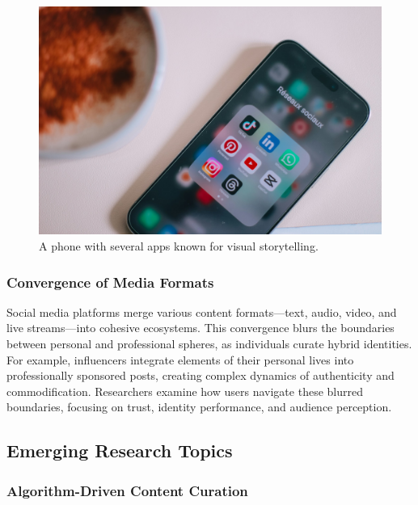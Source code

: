 \documentclass[
]{book}
\begin{document}
\begin{figure}
\centering
\includegraphics[width=1\linewidth,height=\textheight,keepaspectratio]{images/visual-story.jpg}
\caption{A phone with several apps known for visual storytelling.}
\end{figure}

\subsubsection*{Convergence of Media Formats}\label{convergence-of-media-formats}

Social media platforms merge various content formats---text, audio, video, and live streams---into cohesive ecosystems. This convergence blurs the boundaries between personal and professional spheres, as individuals curate hybrid identities. For example, influencers integrate elements of their personal lives into professionally sponsored posts, creating complex dynamics of authenticity and commodification. Researchers examine how users navigate these blurred boundaries, focusing on trust, identity performance, and audience perception.

\subsection*{Emerging Research Topics}\label{emerging-research-topics}

\subsubsection*{Algorithm-Driven Content Curation}\label{algorithm-driven-content-curation}
\end{document}

